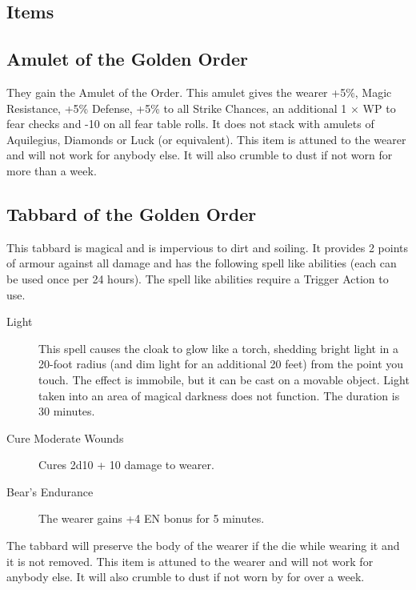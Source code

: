 \documentclass[a4paper]{article}
\begin{document}
\begin{multicols*}{3}
\section*{Items}

\subsection{Amulet of the Golden Order}

They gain the Amulet of the Order.  This amulet gives the wearer +5\%,
Magic Resistance, +5\% Defense, +5\% to all Strike Chances, an
additional 1 $\times$ WP to fear checks and -10 on all fear table
rolls.  It does not stack with amulets of Aquilegius, Diamonds or Luck
(or equivalent).  This item is attuned to the wearer and will not work
for anybody else.  It will also crumble to dust if not worn for more
than a week.

\subsection{Tabbard of the Golden Order}

This tabbard is magical and is impervious to dirt and soiling.  It
provides 2 points of armour against all damage and has the following
spell like abilities (each can be used once per 24 hours).  The spell
like abilities require a Trigger Action to use.

\begin{description}
\item[Light] This spell causes the cloak to glow like a torch,
  shedding bright light in a 20-foot radius (and dim light for an
  additional 20 feet) from the point you touch. The effect is
  immobile, but it can be cast on a movable object. Light taken into
  an area of magical darkness does not function.  The duration is 30
  minutes.

\item[Cure Moderate Wounds] Cures 2d10 + 10 damage to wearer.

\item[Bear's Endurance] The wearer gains +4 EN bonus for 5 minutes.
\end{description}

The tabbard will preserve the body of the wearer if the die while
wearing it and it is not removed.  This item is attuned to the wearer
and will not work for anybody else.  It will also crumble to dust if
not worn by for over a week.



\end{multicols*}
\end{document}

